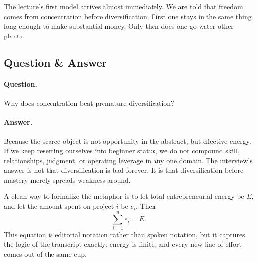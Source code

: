 The lecture's first model arrives almost immediately. We are told that freedom comes from concentration before diversification. First one stays in the same thing long enough to make substantial money. Only then does one go water other plants.

\subsection{Question \& Answer}

\paragraph{Question.} Why does concentration beat premature diversification?

\paragraph{Answer.} Because the scarce object is not opportunity in the abstract, but effective energy. If we keep resetting ourselves into beginner status, we do not compound skill, relationships, judgment, or operating leverage in any one domain. The interview's answer is not that diversification is bad forever. It is that diversification before mastery merely spreads weakness around.

A clean way to formalize the metaphor is to let total entrepreneurial energy be \(E\), and let the amount spent on project \(i\) be \(e_i\). Then
\begin{equation}
\sum_{i=1}^{n} e_i = E.
\end{equation}
This equation is editorial notation rather than spoken notation, but it captures the logic of the transcript exactly: energy is finite, and every new line of effort comes out of the same cup.

\begin{figure}[h]
\centering
{}
\end{figure}

